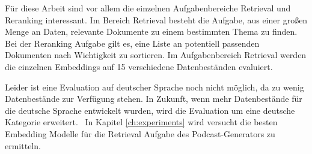 Für diese Arbeit sind vor allem die einzelnen Aufgabenbereiche Retrieval und Reranking interessant. Im Bereich Retrieval besteht die Aufgabe, aus einer großen Menge an Daten, relevante Dokumente zu einem bestimmten Thema zu finden.
Bei der Reranking Aufgabe gilt es, eine Liste an potentiell passenden Dokumenten nach Wichtigkeit zu sortieren.
Im Aufgabenbereich Retrieval werden die einzelnen Embeddings auf 15 verschiedene Datenbeständen evaluiert.~\cite{muennighoff2023}

Leider ist eine Evaluation auf deutscher Sprache noch nicht möglich, da zu wenig Datenbestände zur Verfügung stehen. 
In Zukunft, wenn mehr Datenbestände für die deutsche Sprache entwickelt wurden, wird die Evaluation um eine deutsche Kategorie erweitert.~\cite{muennighoff2023a}
In Kapitel \autoref{ch:experiments} wird versucht die besten Embedding Modelle für die Retrieval Aufgabe des Podcast-Generators zu ermitteln.





